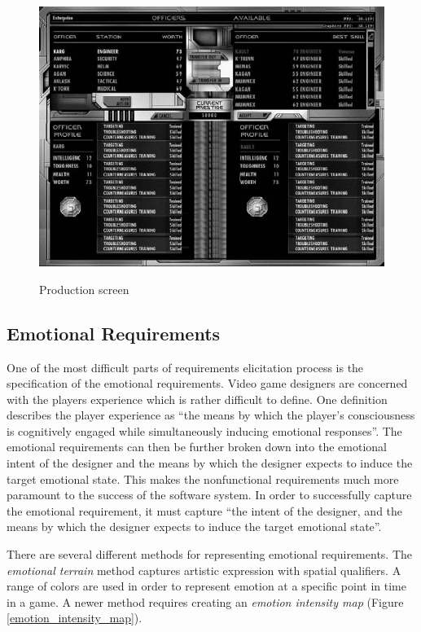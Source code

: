 \begin{figure}[!ht]
	\includegraphics[scale=0.5]{Images/final}
	\label{final}
	\caption{Production screen \cite{bethke2003game}}
\end{figure}

\subsection{Emotional Requirements}

One of the most difficult parts of requirements elicitation process is the specification of the emotional requirements. Video game designers are concerned with the players experience which is rather difficult to define. One definition describes the player experience as ``the means by which the player's consciousness is cognitively engaged while simultaneously inducing emotional responses''\cite{callele2006emotional}. The emotional requirements can then be further broken down into the emotional intent of the designer and the means by which the designer expects to induce the target emotional state\cite{callele2006emotional}. This makes the nonfunctional requirements much more paramount to the success of the software system. In order to successfully capture the emotional requirement, it must capture ``the intent of the designer, and the means by which the designer expects to induce the target emotional state''\cite{callele2006emotional}.

There are several different methods for representing emotional requirements. The \emph{emotional terrain} method captures artistic expression with spatial qualifiers. A range of colors are used in order to represent emotion at a specific point in time in a game. A newer method requires creating an \emph{emotion intensity map} (Figure \ref{emotion_intensity_map}).

